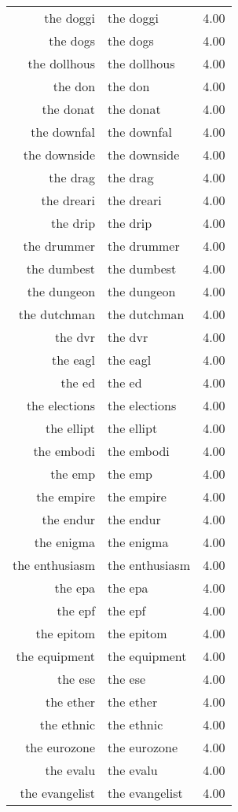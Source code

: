 \begin{table}[ht]
\begin{tabular}{rlr}
  the doggi & the doggi & 4.00 \\ 
  the dogs & the dogs & 4.00 \\ 
  the dollhous & the dollhous & 4.00 \\ 
  the don & the don & 4.00 \\ 
  the donat & the donat & 4.00 \\ 
  the downfal & the downfal & 4.00 \\ 
  the downside & the downside & 4.00 \\ 
  the drag & the drag & 4.00 \\ 
  the dreari & the dreari & 4.00 \\ 
  the drip & the drip & 4.00 \\ 
  the drummer & the drummer & 4.00 \\ 
  the dumbest & the dumbest & 4.00 \\ 
  the dungeon & the dungeon & 4.00 \\ 
  the dutchman & the dutchman & 4.00 \\ 
  the dvr & the dvr & 4.00 \\ 
  the eagl & the eagl & 4.00 \\ 
  the ed & the ed & 4.00 \\ 
  the elections & the elections & 4.00 \\ 
  the ellipt & the ellipt & 4.00 \\ 
  the embodi & the embodi & 4.00 \\ 
  the emp & the emp & 4.00 \\ 
  the empire & the empire & 4.00 \\ 
  the endur & the endur & 4.00 \\ 
  the enigma & the enigma & 4.00 \\ 
  the enthusiasm & the enthusiasm & 4.00 \\ 
  the epa & the epa & 4.00 \\ 
  the epf & the epf & 4.00 \\ 
  the epitom & the epitom & 4.00 \\ 
  the equipment & the equipment & 4.00 \\ 
  the ese & the ese & 4.00 \\ 
  the ether & the ether & 4.00 \\ 
  the ethnic & the ethnic & 4.00 \\ 
  the eurozone & the eurozone & 4.00 \\ 
  the evalu & the evalu & 4.00 \\ 
  the evangelist & the evangelist & 4.00 \\ 

\end{tabular}
\end{table}
